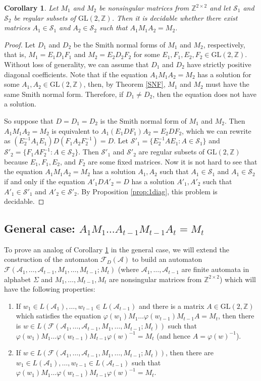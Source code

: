 \documentclass[fontsize=11pt,DIV=13,paper=letter]{scrartcl}
\newtheorem{corollary}[theorem]{Corollary}
\theoremstyle{definition}
\newcommand{\A}{\mathcal{A}}
\newcommand{\Z}{\mathbb{Z}}
\newcommand{\F}{\mathcal{F}}
\newcommand{\s}{\mathcal{S}}
\newcommand{\GL}{\mathrm{GL}(2,\Z)}
\renewcommand{\phi}{\varphi}
\begin{document}
\begin{corollary}\label{cor:1diag}
Let $M_1$ and $M_2$ be nonsingular matrices from $\Z^{2\times 2}$ and let $\s_1$ and $\s_2$ be regular subsets of $\GL$. Then it is decidable whether there exist matrices $A_1\in \s_1$ and $A_2\in \s_2$ such that $A_1M_1A_2=M_2$.
\end{corollary}

\begin{proof}
Let $D_1$ and $D_2$ be the Smith normal forms of $M_1$ and $M_2$, respectively, that is, $M_1=E_1D_1F_1$ and $M_2=E_2D_2F_2$ for some $E_1,F_1,E_2,F_2\in \GL$. Without loss of generality, we can assume that $D_1$ and $D_2$ have strictly positive diagonal coefficients. Note that if the equation $A_1M_1A_2=M_2$ has a solution for some $A_1,A_2\in \GL$, then, by Theorem \ref{SNF}, $M_1$ and $M_2$ must have the same Smith normal form. Therefore, if $D_1\neq D_2$, then the equation does not have a solution.

So suppose that $D=D_1=D_2$ is the Smith normal form of $M_1$ and $M_2$. Then $A_1M_1A_2=M_2$ is equivalent to $A_1(E_1DF_1)A_2=E_2DF_2$, which we can rewrite as $(E_2^{-1}A_1E_1)D(F_1A_2F_2^{-1})=D$. Let $\s'_1=\{E_2^{-1}AE_1 : A\in \s_1\}$ and $\s'_2=\{F_1AF_2^{-1} : A\in \s_2\}$. Then $\s'_1$ and $\s'_2$ are regular subsets of $\GL$ because $E_1,F_1,E_2$, and $F_2$ are some fixed matrices. Now it is not hard to see that the equation $A_1M_1A_2=M_2$ has a solution $A_1,A_2$ such that $A_1\in \s_1$ and $A_1\in \s_2$ if and only if the equation $A'_1DA'_2=D$ has a solution $A'_1,A'_2$ such that $A'_1\in \s'_1$ and $A'_2\in \s'_2$. By Proposition \ref{prop:1diag}, this problem is decidable.
\end{proof}

\subsection{General case: $A_1M_1\dots A_{t-1}M_{t-1}A_t= M_t$}\label{Gen}

To prove an analog of Corollary \ref{cor:1diag} in the general case, we will extend the construction of the automaton $\F_D(\A)$ to  build an automaton $\F(\A_1,\dots,\A_{t-1},M_1,\dots,M_{t-1};M_t)$ (where $\A_1,\dots,\A_{t-1}$ are finite automata in alphabet $\Sigma$ and $M_1,\dots,M_{t-1},M_t$ are nonsingular matrices from $\Z^{2\times 2}$) which will have the following properties:
\begin{enumerate}[(1)]
\item If $w_1\in L(\A_1),\dots,w_{t-1}\in L(\A_{t-1})$ and there is a matrix $A\in \GL$ which satisfies the equation $\phi(w_1)M_1\dots\phi(w_{t-1})M_{t-1}A=M_t$, then there is $w\in L(\F(\A_1,\dots,\A_{t-1},M_1,\dots,M_{t-1};M_t))$ such that $\phi(w_1)M_1\dots\phi(w_{t-1})M_{t-1}\phi(w)^{-1}=M_t$ (and hence $A=\phi(w)^{-1}$).

\item If $w\in L(\F(\A_1,\dots,\A_{t-1},M_1,\dots,M_{t-1};M_t))$, then there are $w_1\in L(\A_1),\dots,w_{t-1}\in L(\A_{t-1})$ such that $\phi(w_1)M_1\dots\phi(w_{t-1})M_{t-1}\phi(w)^{-1}=M_t$.
\end{enumerate}
\end{document}
